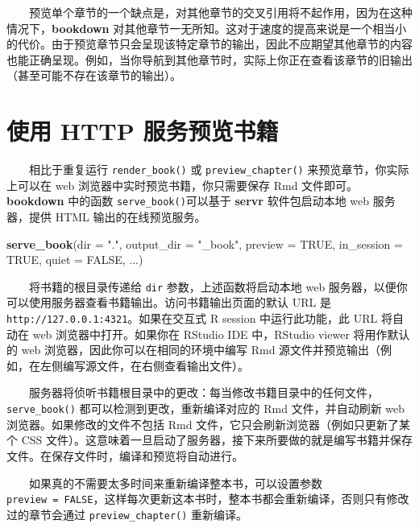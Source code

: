 \documentclass[
  12pt,
]{krantz}
\newenvironment{Shaded}{\begin{snugshade}}{\end{snugshade}}
\newcommand{\AttributeTok}[1]{\textcolor[rgb]{0.13,0.29,0.53}{#1}}
\newcommand{\ConstantTok}[1]{\textcolor[rgb]{0.56,0.35,0.01}{#1}}
\newcommand{\FunctionTok}[1]{\textcolor[rgb]{0.13,0.29,0.53}{\textbf{#1}}}
\newcommand{\NormalTok}[1]{#1}
\newcommand{\StringTok}[1]{\textcolor[rgb]{0.31,0.60,0.02}{#1}}
\theoremstyle{definition}
\theoremstyle{definition}
\theoremstyle{definition}
\theoremstyle{definition}
\theoremstyle{remark}
\begin{document}
  预览单个章节的一个缺点是，对其他章节的交叉引用将不起作用，因为在这种情况下，\textbf{bookdown} 对其他章节一无所知。这对于速度的提高来说是一个相当小的代价。由于预览章节只会呈现该特定章节的输出，因此不应期望其他章节的内容也能正确呈现。例如，当你导航到其他章节时，实际上你正在查看该章节的旧输出（甚至可能不存在该章节的输出）。

\hypertarget{ux4f7fux7528-http-ux670dux52a1ux9884ux89c8ux4e66ux7c4d}{%
\section{使用 HTTP 服务预览书籍}\label{ux4f7fux7528-http-ux670dux52a1ux9884ux89c8ux4e66ux7c4d}}

  相比于重复运行 \texttt{render\_book()} 或 \texttt{preview\_chapter()} 来预览章节，你实际上可以在 web 浏览器中实时预览书籍，你只需要保存 Rmd 文件即可。\textbf{bookdown} 中的函数 \texttt{serve\_book()}可以基于 \textbf{servr} 软件包\citep{R-servr}启动本地 web 服务器，提供 HTML 输出的在线预览服务。

\begin{Shaded}
\begin{Highlighting}[]
\FunctionTok{serve\_book}\NormalTok{(}\AttributeTok{dir =} \StringTok{"."}\NormalTok{, }\AttributeTok{output\_dir =} \StringTok{"\_book"}\NormalTok{,}
  \AttributeTok{preview =} \ConstantTok{TRUE}\NormalTok{, }\AttributeTok{in\_session =} \ConstantTok{TRUE}\NormalTok{, }\AttributeTok{quiet =} \ConstantTok{FALSE}\NormalTok{,}
\NormalTok{  ...)}
\end{Highlighting}
\end{Shaded}

  将书籍的根目录传递给 \texttt{dir} 参数，上述函数将启动本地 web 服务器，以便你可以使用服务器查看书籍输出。访问书籍输出页面的默认 URL 是 \texttt{http://127.0.0.1:4321}。如果在交互式 R session 中运行此功能，此 URL 将自动在 web 浏览器中打开。如果你在 RStudio IDE 中，RStudio viewer 将用作默认的 web 浏览器，因此你可以在相同的环境中编写 Rmd 源文件并预览输出（例如，在左侧编写源文件，在右侧查看输出文件）。

  服务器将侦听书籍根目录中的更改：每当修改书籍目录中的任何文件，\texttt{serve\_book()} 都可以检测到更改，重新编译对应的 Rmd 文件，并自动刷新 web 浏览器。如果修改的文件不包括 Rmd 文件，它只会刷新浏览器（例如只更新了某个 CSS 文件）。这意味着一旦启动了服务器，接下来所要做的就是编写书籍并保存文件。在保存文件时，编译和预览将自动进行。

  如果真的不需要太多时间来重新编译整本书，可以设置参数 \texttt{preview\ =\ FALSE}，这样每次更新这本书时，整本书都会重新编译，否则只有修改过的章节会通过 \texttt{preview\_chapter()} 重新编译。
\end{document}
